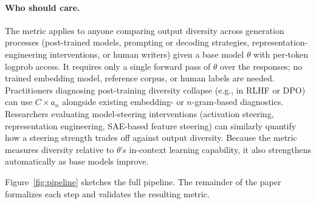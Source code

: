 \paragraph{Who should care.}
The metric applies to anyone comparing output diversity across generation processes (post-trained models, prompting or decoding strategies, representation-engineering interventions, or human writers) given a base model $\theta$ with per-token logprob access.
It requires only a single forward pass of $\theta$ over the responses; no trained embedding model, reference corpus, or human labels are needed.
Practitioners diagnosing post-training diversity collapse (e.g., in RLHF or DPO) can use $C \times a_n$ alongside existing embedding- or $n$-gram-based diagnostics.
Researchers evaluating model-steering interventions (activation steering, representation engineering, SAE-based feature steering) can similarly quantify how a steering strength trades off against output diversity.
Because the metric measures diversity relative to $\theta$'s in-context learning capability, it also strengthens automatically as base models improve.

Figure~\ref{fig:pipeline} sketches the full pipeline.
The remainder of the paper formalizes each step and validates the resulting metric.


